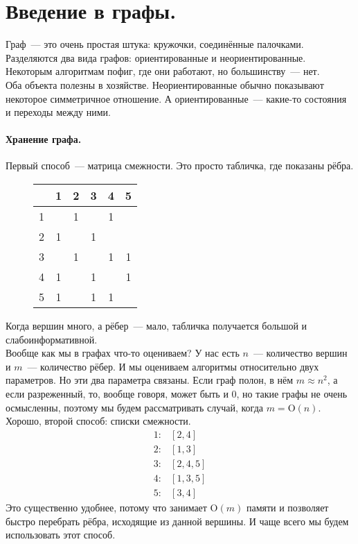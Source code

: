 \documentclass{article}
\begin{document}
    \tableofcontents\pagebreak
    \section{Введение в графы.}
    Граф~--- это очень простая штука: кружочки, соединённые палочками. Разделяются два вида графов: ориентированные и неориентированные. Некоторым алгоритмам пофиг, где они работают, но большинству~--- нет.\\
    Оба объекта полезны в хозяйстве. Неориентированные обычно показывают некоторое симметричное отношение. А ориентированные~--- какие-то состояния и переходы между ними.
    \paragraph{Хранение графа.}
    \begin{figure}[H]
    \end{figure}\noindent
    Первый способ~--- матрица смежности. Это просто табличка, где показаны рёбра.
    \begin{figure}[H]
        \begin{tabular}{c|c|c|c|c|c|}
            & 1 & 2 & 3 & 4 & 5\\
            \hline
            1 &&1&&1&\\
            \hline
            2 &1&&1&&\\
            \hline
            3 &&1&&1&1\\
            \hline
            4 &1&&1&&1\\
            \hline
            5 &1&&1&1&\\
            \hline
        \end{tabular}
    \end{figure}\noindent
    Когда вершин много, а рёбер~--- мало, табличка получается большой и слабоинформативной.\\
    Вообще как мы в графах что-то оцениваем? У нас есть $n$~--- количество вершин и $m$~--- количество рёбер. И мы оцениваем алгоритмы относительно двух параметров. Но эти два параметра связаны. Если граф полон, в нём $m\approx n^2$, а если разреженный, то, вообще говоря, может быть и 0, но такие графы не очень осмысленны, поэтому мы будем рассматривать случай, когда $m=\mathrm O(n)$.\\
    Хорошо, второй способ: списки смежности.
    \[\begin{aligned}
        1:&[2,4]\\
        2:&[1,3]\\
        3:&[2,4,5]\\
        4:&[1,3,5]\\
        5:&[3,4]
    \end{aligned}\]
    Это существенно удобнее, потому что занимает $\mathrm O(m)$ памяти и позволяет быстро перебрать рёбра, исходящие из данной вершины. И чаще всего мы будем использовать этот способ.
\end{document}

